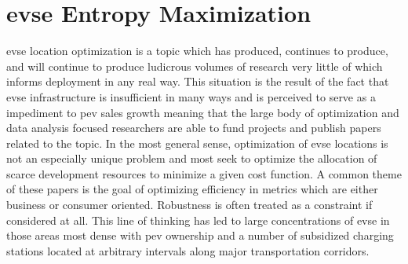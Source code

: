 \section{\gls{evse} Entropy Maximization}

\gls{evse} location optimization is a topic which has produced, continues to produce, and will continue to produce ludicrous volumes of research very little of which informs deployment in any real way. This situation is the result of the fact that \gls{evse} infrastructure is insufficient in many ways and is perceived to serve as a impediment to \gls{pev} sales growth meaning that the large body of optimization and data analysis focused researchers are able to fund projects and publish papers related to the topic. In the most general sense, optimization of \gls{evse} locations is not an especially unique problem and most seek to optimize the allocation of scarce development resources to minimize a given cost function. A common theme of these papers is the goal of optimizing efficiency in metrics which are either business or consumer oriented. Robustness is often treated as a constraint if considered at all. This line of thinking has led to large concentrations of \gls{evse} in those areas most dense with \gls{pev} ownership and a number of subsidized charging stations located at arbitrary intervals along major transportation corridors. 
